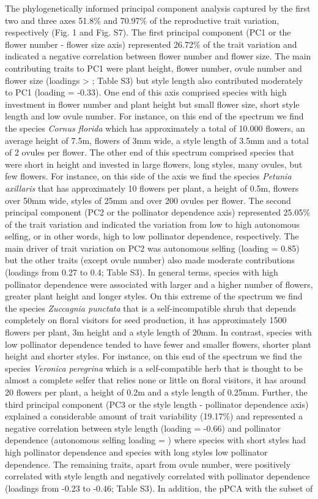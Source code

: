 \documentclass[
  12pt,
  a4paper,
]{article}
\begin{document}
The phylogenetically informed principal component analysis captured by the first two and three axes 51.8\% and 70.97\% of the reproductive trait variation, respectively (Fig. 1 and Fig. S7). The first principal component (PC1 or the flower number - flower size axis) represented 26.72\% of the trait variation and indicated a negative correlation between flower number and flower size. The main contributing traits to PC1 were plant height, flower number, ovule number and flower size (loadings \textgreater{} \textbar; Table S3) but style length also contributed moderately to PC1 (loading = -0.33). One end of this axis comprised species with high investment in flower number and plant height but small flower size, short style length and low ovule number. For instance, on this end of the spectrum we find the species \emph{Cornus florida} which has approximately a total of 10.000 flowers, an average height of 7.5m, flowers of 3mm wide, a style length of 3.5mm and a total of 2 ovules per flower. The other end of this spectrum comprised species that were short in height and invested in large flowers, long styles, many ovules, but few flowers. For instance, on this side of the axis we find the species \emph{Petunia axillaris} that has approximately 10 flowers per plant, a height of 0.5m, flowers over 50mm wide, styles of 25mm and over 200 ovules per flower. The second principal component (PC2 or the pollinator dependence axis) represented 25.05\% of the trait variation and indicated the variation from low to high autonomous selfing, or in other words, high to low pollinator dependence, respectively. The main driver of trait variation on PC2 was autonomous selfing (loading = 0.85) but the other traits (except ovule number) also made moderate contributions (loadings from 0.27 to 0.4; Table S3). In general terms, species with high pollinator dependence were associated with larger and a higher number of flowers, greater plant height and longer styles. On this extreme of the spectrum we find the species \emph{Zuccagnia punctata} that is a self-incompatible shrub that depends completely on floral visitors for seed production, it has approximately 1500 flowers per plant, 3m height and a style length of 20mm. In contrast, species with low pollinator dependence tended to have fewer and smaller flowers, shorter plant height and shorter styles. For instance, on this end of the spectrum we find the species \emph{Veronica peregrina} which is a self-compatible herb that is thought to be almost a complete selfer that relies none or little on floral visitors, it has around 20 flowers per plant, a height of 0.2m and a style length of 0.25mm. Further, the third principal component (PC3 or the style length - pollinator dependence axis) explained a considerable amount of trait variability (19.17\%) and represented a negative correlation between style length (loading = -0.66) and pollinator dependence (autonomous selfing loading = \textbar) where species with short styles had high pollinator dependence and species with long styles low pollinator dependence. The remaining traits, apart from ovule number, were positively correlated with style length and negatively correlated with pollinator dependence (loadings from -0.23 to -0.46; Table S3). In addition, the pPCA with the subset of 
\end{document}

